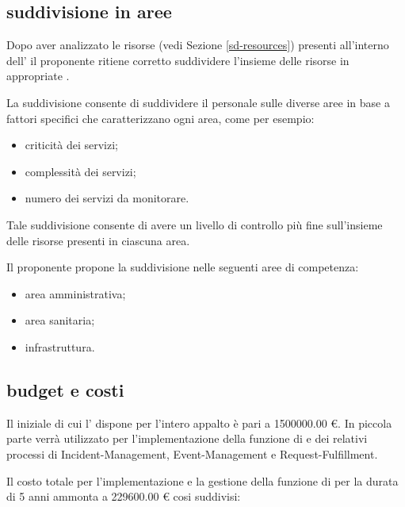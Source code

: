 \subsection[Suddivisione in aree]{suddivisione in aree}
\label{sd-resources-categories}
Dopo aver analizzato le risorse (vedi Sezione \ref{sd-resources}) presenti all'interno dell'\entity{} il proponente ritiene corretto suddividere l'insieme delle risorse in appropriate .

La suddivisione consente di suddividere il personale sulle diverse aree in base a fattori specifici che caratterizzano ogni area, come per esempio:

\begin{itemize}
\item{criticità dei servizi;}
\item{complessità dei servizi;}
\item{numero dei servizi da monitorare.}
\end{itemize}

Tale suddivisione consente di avere un livello di controllo più fine sull'insieme delle risorse presenti in ciascuna area. 

Il proponente propone la suddivisione nelle seguenti aree di competenza:

\begin{itemize}
\item{area amministrativa;}
\item{area sanitaria;}
\item{infrastruttura.}
\end{itemize}

\subsection[Budget e costi]{budget e costi}
\label{sd-resources-budget}
Il  iniziale di cui l'\entity{} dispone per l'intero appalto è pari a \num{1500000.00} \euro{}. In piccola parte verrà utilizzato per l'implementazione della funzione di  e dei relativi processi di \acf{Incident-Management}, \acf{Event-Management} e \acf{Request-Fulfillment}.

Il costo totale per l'implementazione e la gestione della funzione di  per la durata di \num{5} anni ammonta a \num{229600.00} \euro{} cosi suddivisi:

